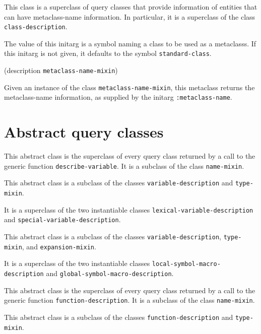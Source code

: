 This class is a superclass of query classes that provide information
of entities that can have metaclass-name information.  In
particular, it is a superclass of the class
\texttt{class-description}.


The value of this initarg is a symbol naming a class to be used as a
metaclasss.  If this initarg is not given, it defaults to the symbol
\texttt{standard-class}.

 {(description {\tt metaclass-name-mixin})}

Given an instance of the class \texttt{metaclass-name-mixin}, this
metaclass returns the metaclass-name information, as supplied by the
initarg \texttt{:metaclass-name}.

\section{Abstract query classes}


This abstract class is the superclass of every query class returned by
a call to the generic function \texttt{describe-variable}.  It is a
subclass of the class \texttt{name-mixin}.


This abstract class is a subclass of the classes
\texttt{variable-description} and \texttt{type-mixin}.

It is a superclass of the two instantiable classes
\texttt{lexical-variable-description} and
\texttt{special-variable-description}.


This abstract class is a subclass of the classes
\texttt{variable-description}, \texttt{type-mixin}, and
\texttt{expansion-mixin}.

It is a superclass of the two instantiable classes
\texttt{local-symbol-macro-description} and
\texttt{global-symbol-macro-description}.


This abstract class is the superclass of every query class returned by
a call to the generic function \texttt{function-description}.  It is a
subclass of the class \texttt{name-mixin}.


This abstract class is a subclass of the classes
\texttt{function-description} and \texttt{type-mixin}.

